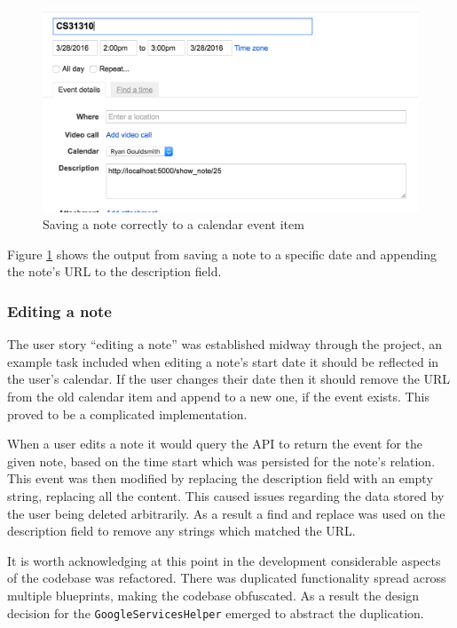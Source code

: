{{{{{{{\begin{figure}[H]
  \centering
  \includegraphics[scale=0.4]{images/saved_to_calendar}
  \caption{Saving a note correctly to a calendar event item}
  \label{fig:saved_to_calendar}
\end{figure}

Figure \ref{fig:saved_to_calendar} shows the output from saving a note to a specific date and appending the note's URL to the description field.

\subsubsection{Editing a note}
The user story ``editing a note'' was established midway through the project, an example task included when editing a note's start date it should be reflected in the user's calendar. If the user changes their date then it should remove the URL from the old calendar item and append to a new one, if the event exists. This proved to be a complicated implementation.

When a user edits a note it would query the API to return the event for the given note, based on the time start which was persisted for the note's relation. This event was then modified by replacing the description field with an empty string, replacing all the content. This caused issues regarding the data stored by the user being deleted arbitrarily. As a result a find and replace was used on the description field to remove any strings which matched the URL.

It is worth acknowledging at this point in the development considerable aspects of the codebase was refactored. There was duplicated functionality spread across multiple blueprints, making the codebase obfuscated. As a result the design decision for the \texttt{GoogleServicesHelper} emerged to abstract the duplication.

}}}}}}}
